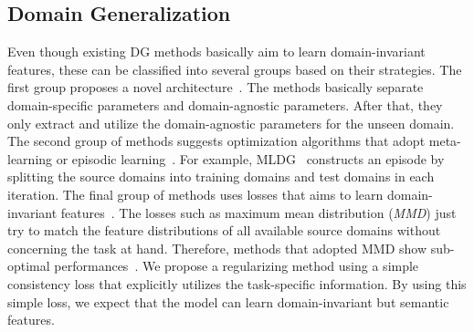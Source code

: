 \subsection{Domain Generalization}
Even though existing DG methods basically aim to learn domain-invariant features, these can be classified into several groups based on their strategies. The first group proposes a novel architecture~\cite{Khosla12undobias, Li2017dg}. The methods basically separate domain-specific parameters and domain-agnostic parameters. After that, they only extract and utilize the domain-agnostic parameters for the unseen domain. The second group of methods suggests optimization algorithms that adopt meta-learning or episodic learning~\cite{li2019episodic, Li2018MLDG, NIPS2018_metareg}. For example, MLDG~\cite{Li2018MLDG} constructs an episode by splitting the source domains into training domains and test domains in each iteration. The final group of methods uses losses that aims to learn domain-invariant features~\cite{Ghifary2015mtae, muandet2013domaingeneralization, mmdaaecvpr2018, carlucci2019domain}. The losses such as maximum mean distribution (\textit{MMD}) just try to match the feature distributions of all available source domains without concerning the task at hand. Therefore, methods that adopted MMD show sub-optimal performances~\cite{Saito2018, Saito2018b}. We propose a regularizing method using a simple consistency loss that explicitly utilizes the task-specific information. By using this simple loss, we expect that the model can learn domain-invariant but semantic features.